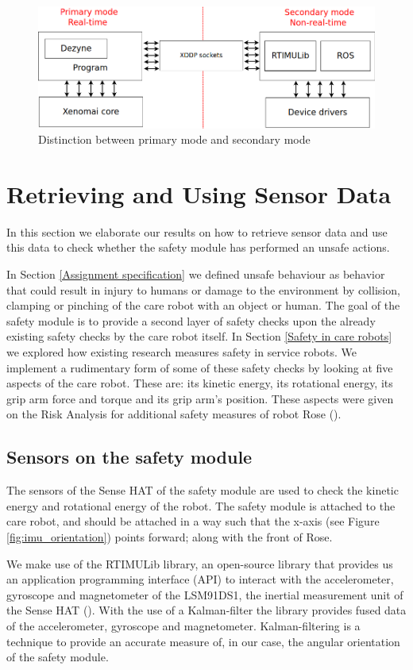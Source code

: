 \documentclass[12pt]{scrreprt}
\begin{document}
\begin{figure}[H]
    \centering
    \includegraphics[width=\textwidth]{Figures/results/communication_scheme.png}
    \caption{Distinction between primary mode and secondary mode}
    \label{fig:communication_scheme}
\end{figure}

\newpage
\section{Retrieving and Using Sensor Data}
\label{Retrieving and Using Sensor Data}
In this section we elaborate our results on how to retrieve sensor data and use this data to check whether the safety module has performed an unsafe actions.
\par
In Section \ref{Assignment specification} we defined unsafe behaviour as behavior that could result in injury to humans or damage to the environment by collision, clamping or pinching of the care robot with an object or human. The goal of the safety module is to provide a second layer of safety checks upon the already existing safety checks by the care robot itself. In Section \ref{Safety in care robots} we explored how existing research measures safety in service robots. We implement a rudimentary form of some of these safety checks by looking at five aspects of the care robot. These are: its kinetic energy, its rotational energy, its grip arm force and torque and its grip arm's position. These aspects were given on the Risk Analysis for additional safety measures of robot Rose (\cite{risk_analysis_additional}).

\subsection{Sensors on the safety module}
The sensors of the Sense HAT of the safety module are used to check the kinetic energy and rotational energy of the robot. The safety module is attached to the care robot, and should be attached in a way such that the x-axis (see Figure \ref{fig:imu_orientation}) points forward; along with the front of Rose.
\par
We make use of the RTIMULib library, an open-source library that provides us an application programming interface (API) to interact with the accelerometer, gyroscope and magnetometer of the LSM91DS1, the inertial measurement unit of the Sense HAT (\cite{rtimulib}). With the use of a Kalman-filter the library provides fused data of the accelerometer, gyroscope and magnetometer. Kalman-filtering is a technique to provide an accurate measure of, in our case, the angular orientation of the safety module.
\end{document}
